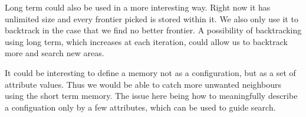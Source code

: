 Long term could also be used in a more interesting way. Right now it has unlimited size and every frontier picked is stored within it. We also only use it to backtrack in the case that we find no better frontier. A possibility of backtracking using long term, which increases at each iteration, could allow us to backtrack more and search new areas. 

It could be interesting to define a memory not as a configuration, but as a set of attribute values. Thus we would be able to catch more unwanted neighbours using the short term memory. The issue here being how to meaningfully describe a configuation only by a few attributes, which can be used to guide search. 


